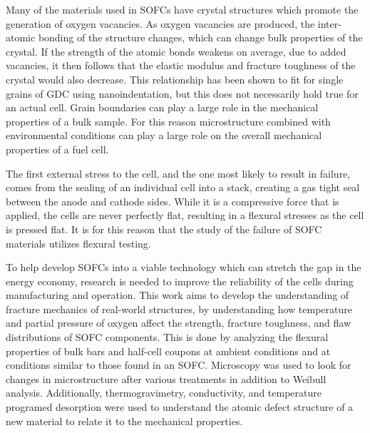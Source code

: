 Many of the materials used in SOFCs have crystal structures which promote the generation of oxygen vacancies.
As oxygen vacancies are produced, the inter-atomic bonding of the structure changes, which can change bulk properties of the crystal.\cite{Bishop2014,Duncan2006}
If the strength of the atomic bonds weakens on average, due to added vacancies, it then follows that the elastic modulus and fracture toughness of the crystal would also decrease.
This relationship has been shown to fit for single grains of GDC using nanoindentation, but this does not necessarily hold true for an actual cell.\cite{Wang2007}
Grain boundaries can play a large role in the mechanical properties of a bulk sample.
For this reason microstructure combined with environmental conditions can play a large role on the overall mechanical properties of a fuel cell.

The first external stress to the cell, and the one most likely to result in failure, comes from the  sealing of an individual cell into a stack, creating a gas tight seal between the anode and cathode sides.
While it is a compressive force that is applied, the cells are never perfectly flat, resulting in a flexural stresses as the cell is pressed flat.
It is for this reason that the study of the failure of SOFC materials utilizes flexural testing.


To help develop SOFCs into a viable technology which can stretch the gap in the energy economy, research is needed to improve the reliability of the cells during manufacturing and operation.
This work aims to develop the understanding of fracture mechanics of real-world structures, by understanding how temperature and partial pressure of oxygen affect the strength, fracture toughness, and flaw distributions of SOFC components.
This is done by analyzing the flexural properties of bulk bars and half-cell coupons at ambient conditions and at conditions similar to those found in an SOFC.
Microscopy was used to look for changes in microstructure after various treatments in addition to Weibull analysis.
Additionally, thermogravimetry, conductivity, and temperature programed desorption were used to understand the atomic defect structure of a new material to relate it to the mechanical properties.
